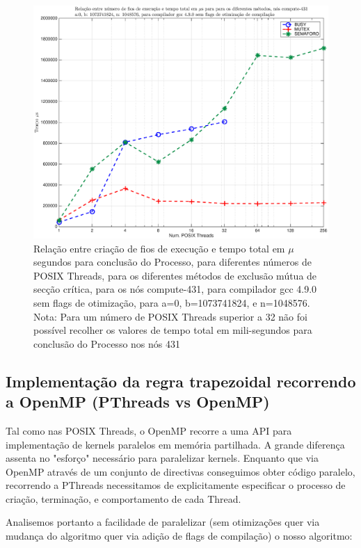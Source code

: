 \documentclass[conference,compsoc]{IEEEtran}
\begin{document}
\begin{figure}[H]
\centering
\includegraphics[width=1.1\columnwidth]{EPS/time_all.eps}
\caption{Relação entre criação de fios de execução e tempo total em $\mu$ segundos para conclusão do Processo, para diferentes números de POSIX Threads, para os diferentes métodos de exclusão mútua de secção crítica, para os nós compute-431, para compilador gcc 4.9.0 sem flags de otimização, para a=0, b=1073741824, e n=1048576.  \\{Nota: Para um número de POSIX Threads superior a 32 não foi possível recolher os valores de tempo total em mili-segundos para conclusão do Processo nos nós 431} }
\label{fig:time_all}
\end{figure}

\subsection{Implementação da regra trapezoidal recorrendo a OpenMP (PThreads vs OpenMP)}
Tal como nas POSIX Threads, o OpenMP recorre a uma API para implementação de kernels paralelos em memória partilhada. A grande diferença assenta no "esforço" necessário para paralelizar kernels. Enquanto que via OpenMP através de um conjunto de directivas conseguimos obter código paralelo, recorrendo a PThreads necessitamos de explicitamente especificar o processo de criação, terminação, e comportamento de cada Thread. \par 
Analisemos portanto a facilidade de paralelizar (sem otimizações quer via mudança do algoritmo quer via adição de flags de compilação) o nosso algoritmo:
\end{document}
